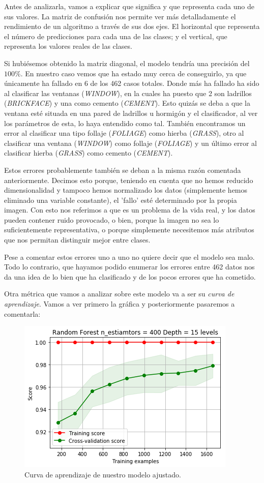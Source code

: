 \documentclass[11pt,a4paper]{article}
\begin{document}
Antes de analizarla, vamos a explicar que significa y que representa cada uno de sus valores. La matriz de confusión nos permite ver más detalladamente el rendimiento de un algoritmo a través de sus dos ejes. El horizontal que representa el número de predicciones para cada una de las clases; y el vertical, que representa los valores reales de las clases.

Si hubiésemos obtenido la matriz diagonal, el modelo tendría una precisión del $100\%$. En nuestro caso vemos que ha estado muy cerca de conseguirlo, ya que únicamente ha fallado en 6 de los 462 casos totales. Donde más ha fallado ha sido al clasificar las ventanas (\textit{WINDOW}), en la cuales ha puesto que 2 son ladrillos (\textit{BRICKFACE}) y una como cemento (\textit{CEMENT}). Esto quizás se deba a que la ventana esté situada en una pared de ladrillos u hormigón y el clasificador, al ver los parámetros de esta, lo haya entendido como tal. También encontramos un error al clasificar una tipo follaje (\textit{FOLIAGE}) como hierba (\textit{GRASS}), otro al clasificar una ventana (\textit{WINDOW}) como follaje (\textit{FOLIAGE}) y un último error al clasificar hierba (\textit{GRASS}) como cemento (\textit{CEMENT}).

Estos errores probablemente también se deban a la misma razón comentada anteriormente. Decimos esto porque, teniendo en cuenta que no hemos reducido dimensionalidad y tampoco hemos normalizado los datos (simplemente hemos eliminado una variable constante), el 'fallo' esté determinado por la propia imagen. Con esto nos referimos a que es un problema de la vida real, y los datos pueden contener ruido provocado, o bien, porque la imagen no sea lo suficientemente representativa, o porque simplemente necesitemos más atributos que nos permitan distinguir mejor entre clases.

Pese a comentar estos errores uno a uno no quiere decir que el modelo sea malo. Todo lo contrario, que hayamos podido enumerar los errores entre 462 datos nos da una idea de lo bien que ha clasificado y de los pocos errores que ha cometido.

Otra métrica que vamos a analizar sobre este modelo va a ser su \textit{curva de aprendizaje}. Vamos a ver primero la gráfica y posteriormente pasaremos a comentarla:

\begin{figure}[H]
    \centering
    \includegraphics[scale=0.75]{img/lc-rf.png}
    \caption{Curva de aprendizaje de nuestro modelo ajustado.}
    \label{fig:lc-rf}
\end{figure}
\end{document}
